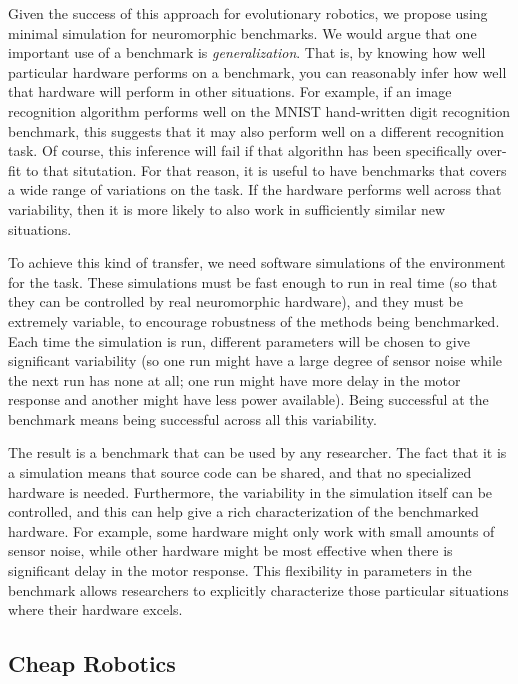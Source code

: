 \documentclass{frontiersSCNS} %
\begin{document}
Given the success of this approach for evolutionary robotics, we propose
using minimal simulation for neuromorphic benchmarks.  We would argue that
one important use of a benchmark is \emph{generalization}.  That is, by knowing how well particular
hardware performs on a benchmark, you can reasonably infer how well
that hardware will perform in other situations.  For example, if an image recognition
algorithm performs well on the MNIST hand-written digit recognition
benchmark, this suggests that it may also perform well on
a different recognition task.  Of course, this inference will fail if that
algorithn has been specifically over-fit to that situtation.  For
that reason, it is useful to have benchmarks that covers a wide range
of variations on the task.  If the hardware performs well across that
variability, then it is more likely to also work in sufficiently similar new situations.

To achieve this kind of transfer, we need software simulations of the environment for the task.
These simulations
must be fast enough to run in real time (so that they can be controlled by
real neuromorphic hardware), and they must be extremely variable, to encourage
robustness of the methods being benchmarked.  Each time
the simulation is run, different parameters will be chosen to give significant variability
(so one run might have a large degree of sensor noise while the next run has
none at all; one run might have more delay in the motor response and another
might have less power available).  Being successful at the benchmark means
being successful across all this variability.  

The result is a benchmark that can be used by any researcher.  The fact
that it is a simulation means that source code can be shared, and that no
specialized hardware is needed.  Furthermore, the variability in the simulation
itself can be controlled, and this can help give a rich characterization of
the benchmarked hardware.  For example, some hardware might only work with
small amounts of sensor noise, while other hardware might be most effective when there
is significant delay in the motor response.  This flexibility in parameters
in the benchmark allows researchers to explicitly characterize those particular
situations where their hardware excels.  

\subsection{Cheap Robotics}
\end{document}
